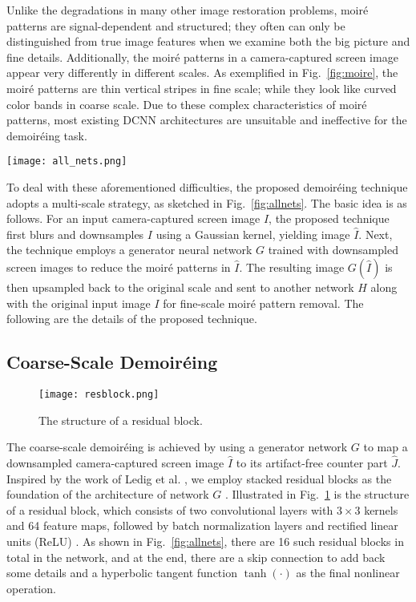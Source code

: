 \documentclass[10pt,twocolumn,letterpaper]{article}
\begin{document}
Unlike the degradations in many other image restoration problems,
moir\'e patterns are signal-dependent and structured; they often can
only be distinguished from true image features when we examine both
the big picture and fine details.  Additionally, the moir\'e patterns
in a camera-captured screen image appear very differently in different
scales.  As exemplified in Fig.~\ref{fig:moire}, the moir\'e patterns
are thin vertical stripes in fine scale; while they look like curved
color bands in coarse scale.  Due to these complex characteristics of
moir\'e patterns, most existing DCNN architectures are unsuitable and
ineffective for the demoir\'eing task.

\begin{figure*}
  \centering
  \texttt{[image: all\_nets.png]}
  \caption{The architecture of the proposed neural network.  The
    kernel size $k$ and the number of feature maps $f$ are marked
    above each convolutional layer.}
  \label{fig:allnets}
\end{figure*}

To deal with these aforementioned difficulties, the proposed
demoir\'eing technique adopts a multi-scale strategy, as sketched in
Fig.~\ref{fig:allnets}.  The basic idea is as follows.  For an input
camera-captured screen image $I$, the proposed technique first blurs
and downsamples $I$ using a Gaussian kernel, yielding image $\hat{I}$.
Next, the technique employs a generator neural network $G$ trained
with downsampled screen images to reduce the moir\'e patterns in
$\hat{I}$.  The resulting image $G(\hat{I})$ is then upsampled back to
the original scale and sent to another network $H$ along with the
original input image $I$ for fine-scale moir\'e pattern removal.  The
following are the details of the proposed technique.

\subsection{Coarse-Scale Demoir\'eing}

\begin{figure}
  \centering
  \texttt{[image: resblock.png]}
  \caption{The structure of a residual block.}
  \label{fig:resblock}
\end{figure}

The coarse-scale demoir\'eing is achieved by using a generator network
$G$ to map a downsampled camera-captured screen image $\hat{I}$ to its
artifact-free counter part $\hat{J}$.  Inspired by the work of Ledig
et al. \cite{ledig2016photo}, we employ stacked residual blocks as the
foundation of the architecture of network $G$
\cite{gross2016training}.  Illustrated in Fig.~\ref{fig:resblock} is
the structure of a residual block, which consists of two convolutional
layers with $3 \times 3$ kernels and 64 feature maps, followed by
batch normalization layers \cite{ioffe2015batch} and rectified linear
units (ReLU) \cite{nair2010rectified}.  As shown in
Fig.~\ref{fig:allnets}, there are 16 such residual blocks in total in
the network, and at the end, there are a skip connection to add back
some details and a hyperbolic tangent function $\tanh(\cdot)$ as the
final nonlinear operation.
\end{document}
